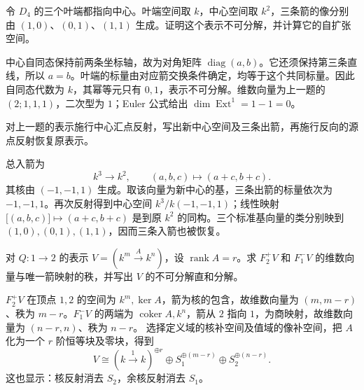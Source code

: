 \begin{optionalexercise}\label{b5:ex:10-d4-three-lines}
	令 \(D_4\) 的三个叶端都指向中心。叶端空间取 \(k\)，中心空间取 \(k^2\)，三条箭的像分别由 \((1,0)\)、\((0,1)\)、\((1,1)\) 生成。证明这个表示不可分解，并计算它的自扩张空间。
\end{optionalexercise}
\begin{solution}
	中心自同态保持前两条坐标轴，故为对角矩阵 \(\operatorname{diag}(a,b)\)。它还须保持第三条直线，所以 \(a=b\)。叶端的标量由对应箭交换条件确定，均等于这个共同标量。因此自同态代数为 \(k\)，其幂等元只有 \(0,1\)，表示不可分解。维数向量为上一题的 \((2;1,1,1)\)，二次型为 \(1\)；Euler 公式给出 \(\dim\operatorname{Ext}^1=1-1=0\)。
\end{solution}

\begin{optionalexercise}\label{b5:ex:10-d4-reflect-center}
	对上一题的表示施行中心汇点反射，写出新中心空间及三条出箭，再施行反向的源点反射恢复原表示。
\end{optionalexercise}
\begin{solution}
	总入箭为
	\[
		k^3\longrightarrow k^2,\qquad(a,b,c)\longmapsto(a+c,b+c).
	\]
	其核由 \((-1,-1,1)\) 生成。取该向量为新中心的基，三条出箭的标量依次为 \(-1,-1,1\)。再次反射得到中心空间 \(k^3/k(-1,-1,1)\)；线性映射 \(\bigl[(a,b,c)\bigr]\mapsto(a+c,b+c)\) 是到原 \(k^2\) 的同构。三个标准基向量的类分别映到 \((1,0),(0,1),(1,1)\)，因而三条入箭也被恢复。
\end{solution}

\begin{optionalexercise}\label{b5:ex:10-reflect-rank}
	对 \(Q:1\to2\) 的表示 \(V=(k^m\xrightarrow{A}k^n)\)，设 \(\operatorname{rank}A=r\)。求 \(F_2^+V\) 和 \(F_1^-V\) 的维数向量与唯一箭映射的秩，并写出 \(V\) 的不可分解直和分解。
\end{optionalexercise}
\begin{solution}
	\(F_2^+V\) 在顶点 \(1,2\) 的空间为 \(k^m,\ker A\)，箭为核的包含，故维数向量为 \((m,m-r)\)、秩为 \(m-r\)。\(F_1^-V\) 的两端为 \(\operatorname{coker}A,k^n\)，箭从 \(2\) 指向 \(1\)，为商映射，故维数向量为 \((n-r,n)\)、秩为 \(n-r\)。 选择定义域的核补空间及值域的像补空间，把 \(A\) 化为一个 \(r\) 阶恒等块及零块，得到
	\[
		V\cong(k\xrightarrow{1}k)^{\oplus r} \oplus S_1^{\oplus(m-r)}\oplus S_2^{\oplus(n-r)}.
	\]
	这也显示：核反射消去 \(S_2\)，余核反射消去 \(S_1\)。
\end{solution}

